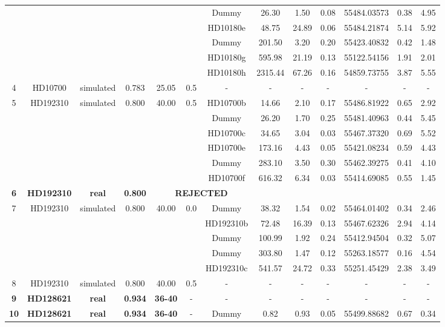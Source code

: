 \documentclass{article}
\begin{document}
\begin{landscape}
\begin{longtable}{ccccccccccccc}
 & & & &  & & Dummy & 26.30 & 1.50 & 0.08 & 55484.03573 & 0.38 & 4.95 \\
 & & & &  & & HD10180e & 48.75 & 24.89 & 0.06 & 55484.21874 & 5.14 & 5.92 \\
 & & & &  & & Dummy & 201.50 & 3.20 & 0.20 & 55423.40832 & 0.42 & 1.48 \\
 & & & &  & & HD10180g & 595.98 & 21.19 & 0.13 & 55122.54156 & 1.91 & 2.01 \\
 & & & &  & & HD10180h & 2315.44 & 67.26 & 0.16 & 54859.73755 & 3.87 & 5.55 \\
\hline
4 & HD10700 & simulated & 0.783 & 25.05 & 0.5 & - & - & - & - & - & - & -\\
\hline
5 & HD192310 & simulated & 0.800 & 40.00 & 0.5 & HD10700b & 14.66 & 2.10 & 0.17 & 55486.81922 & 0.65 & 2.92 \\
 & & & &  & & Dummy & 26.20 & 1.70 & 0.25 & 55481.40963 & 0.44 & 5.45 \\
 & & & &  & & HD10700c & 34.65 & 3.04 & 0.03 & 55467.37320 & 0.69 & 5.52 \\
 & & & &  & & HD10700e & 173.16 & 4.43 & 0.05 & 55421.08234 & 0.59 & 4.43 \\
 & & & &  & & Dummy & 283.10 & 3.50 & 0.30 & 55462.39275 & 0.41 & 4.10 \\
 & & & &  & & HD10700f & 616.32 & 6.34 & 0.03 & 55414.69085 & 0.55 & 1.45 \\
\hline
\bf{6} & \bf{HD192310} & \bf{real} & \bf{0.800} & \multicolumn{3}{c}{{\bf REJECTED}} & & & & & & \\
\hline
7 & HD192310 & simulated & 0.800 & 40.00 & 0.0 & Dummy & 38.32 & 1.54 & 0.02 & 55464.01402 & 0.34 & 2.46 \\
 & & & &  & & HD192310b & 72.48 & 16.39 & 0.13 & 55467.62326 & 2.94 & 4.14 \\
 & & & &  & & Dummy & 100.99 & 1.92 & 0.24 & 55412.94504 & 0.32 & 5.07 \\
 & & & &  & & Dummy & 303.80 & 1.47 & 0.12 & 55263.18577 & 0.16 & 4.54 \\
 & & & &  & & HD192310c & 541.57 & 24.72 & 0.33 & 55251.45429 & 2.38 & 3.49 \\
\hline
8 & HD192310 & simulated & 0.800 & 40.00 & 0.5 & - & - & - & - & - & - & -\\
\hline
\bf{9} & \bf{HD128621} & \bf{\bf{real}} & \bf{0.934} & \bf{36-40} & - & - & - & - & - & - & - & -\\
\hline
\bf{10} & \bf{HD128621} & \bf{\bf{real}} & \bf{0.934} & \bf{36-40} & - & Dummy & 0.82 & 0.93 & 0.05 & 55499.88682 & 0.67 & 0.34 \\

\end{longtable}
\end{landscape}
\end{document}
